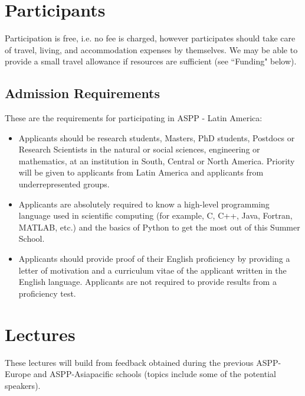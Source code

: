 \documentclass{article}[11pt]
\begin{document}
\section*{Participants}
Participation is free, i.e. no fee is charged, however participates should take care of travel, living, and accommodation expenses by themselves.
We may be able to provide a small travel allowance if resources are sufficient (see ``Funding" below).

\subsection*{Admission Requirements}
These are the requirements for participating in ASPP - Latin America:
\begin{itemize}
    \item Applicants should be research students, Masters, PhD students, Postdocs or Research Scientists in the natural or social sciences, engineering or mathematics, at an institution in South, Central or North America. Priority will be given to applicants from Latin America and applicants from underrepresented groups.
    \item Applicants are absolutely required to know a high-level programming language used in scientific computing (for example, C, C++, Java, Fortran, MATLAB, etc.) and the basics of Python to get the most out of this Summer School.
    \item Applicants should provide proof of their English proficiency by providing a letter of motivation and a curriculum vitae of the applicant written in the English language. Applicants are not required to provide results from a proficiency test.  
\end{itemize}

\section*{Lectures }%

These lectures will build from feedback obtained during the previous 
ASPP-Europe and ASPP-Asiapacific schools (topics include some of the 
potential speakers).
\end{document}
